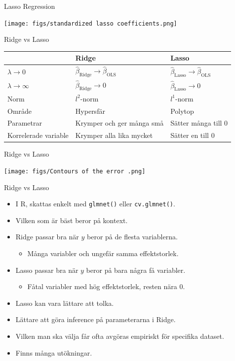 \documentclass[10pt,english]{beamer}
\begin{document}
\begin{frame}{Lasso Regression}
    
    \texttt{[image: figs/standardized lasso coefficients.png]}

\end{frame}

\begin{frame}{Ridge vs Lasso}
    \begin{tabular}{lll}
        & Ridge & Lasso \\ \hline
        $\lambda \to 0$ & $\hat{\beta}_{\text{Ridge}} \to \hat{\beta}_{\text{OLS}}$ & $\hat{\beta}_{\text{Lasso}} \to \hat{\beta}_{\text{OLS}}$ \\
        $\lambda \to \infty$ &  $\hat{\beta}_{\text{Ridge}} \to 0$ &  $\hat{\beta}_{\text{Lasso}} \to 0$ \\
        Norm & $l^2$-norm & $l^1$-norm \\
        Område & Hypersfär & Polytop \\
        Parametrar & Krymper och ger många små & Sätter många till 0 \\
        Korrelerade variable & Krymper alla lika mycket & Sätter en till 0
    \end{tabular}
\end{frame}

\begin{frame}{Ridge vs Lasso}

    \texttt{[image: figs/Contours of the error .png]}
    
\end{frame}

\begin{frame}{Ridge vs Lasso}
    
    \begin{itemize}
        \item I R, skattas enkelt med \texttt{glmnet()} eller \texttt{cv.glmnet()}.
        \item Vilken som är bäst beror på kontext.
        \item Ridge passar bra när $y$ beror på de flesta variablerna.
        \begin{itemize}
            \item Många variabler och ungefär samma effektstorlek.
        \end{itemize}
        \item Lasso passar bra när $y$ beror på bara några få variabler.
        \begin{itemize}
            \item Fåtal variabler med hög effektstorlek, resten nära 0.
        \end{itemize}
        \item Lasso kan vara lättare att tolka.
        \item Lättare att göra inference på parameterarna i Ridge.
        \item Vilken man ska välja får ofta avgöras empiriskt för specifika dataset.
        \item Finns många utökningar.
    \end{itemize}

\end{frame}
\end{document}
